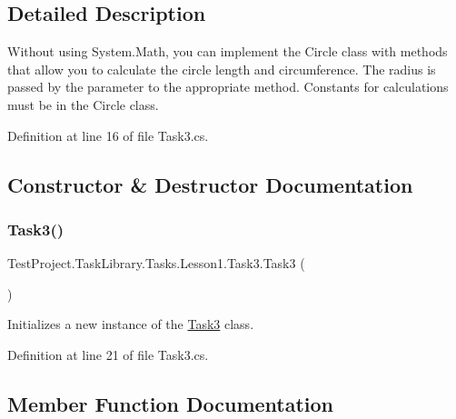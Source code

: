 \subsection{Detailed Description}
Without using System.\+Math, you can implement the Circle class with methods that allow you to calculate the circle length and circumference. The radius is passed by the parameter to the appropriate method. Constants for calculations must be in the Circle class. 



Definition at line 16 of file Task3.\+cs.



\subsection{Constructor \& Destructor Documentation}
\mbox{\label{class_test_project_1_1_task_library_1_1_tasks_1_1_lesson1_1_1_task3_a0410dbb11a62d4c6ff09f04e347a66ab}} 
\subsubsection{\texorpdfstring{Task3()}{Task3()}}
{\footnotesize\ttfamily Test\+Project.\+Task\+Library.\+Tasks.\+Lesson1.\+Task3.\+Task3 (\begin{DoxyParamCaption}{ }\end{DoxyParamCaption})}



Initializes a new instance of the \mbox{\hyperlink{class_test_project_1_1_task_library_1_1_tasks_1_1_lesson1_1_1_task3}{Task3}} class. 



Definition at line 21 of file Task3.\+cs.



\subsection{Member Function Documentation}
\mbox{\label{class_test_project_1_1_task_library_1_1_tasks_1_1_lesson1_1_1_task3_a3cff5e92fe16f7e1c765ade17d53e279}} 
